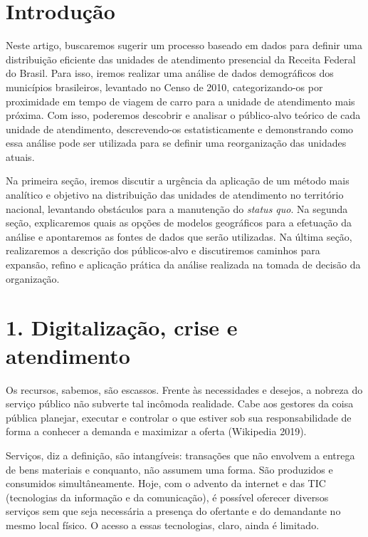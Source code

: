 \documentclass[]{article}
\begin{document}
\hypertarget{introducao}{%
\section{Introdução}\label{introducao}}

Neste artigo, buscaremos sugerir um processo baseado em dados para
definir uma distribuição eficiente das unidades de atendimento
presencial da Receita Federal do Brasil. Para isso, iremos realizar uma
análise de dados demográficos dos municípios brasileiros, levantado no
Censo de 2010, categorizando-os por proximidade em tempo de viagem de
carro para a unidade de atendimento mais próxima. Com isso, poderemos
descobrir e analisar o público-alvo teórico de cada unidade de
atendimento, descrevendo-os estatisticamente e demonstrando como essa
análise pode ser utilizada para se definir uma reorganização das
unidades atuais.

Na primeira seção, iremos discutir a urgência da aplicação de um método
mais analítico e objetivo na distribuição das unidades de atendimento no
território nacional, levantando obstáculos para a manutenção do
\emph{status quo}. Na segunda seção, explicaremos quais as opções de
modelos geográficos para a efetuação da análise e apontaremos as fontes
de dados que serão utilizadas. Na última seção, realizaremos a descrição
dos públicos-alvo e discutiremos caminhos para expansão, refino e
aplicação prática da análise realizada na tomada de decisão da
organização.

\hypertarget{digitalizacao-crise-e-atendimento}{%
\section{1. Digitalização, crise e
atendimento}\label{digitalizacao-crise-e-atendimento}}

Os recursos, sabemos, são escassos. Frente às necessidades e desejos, a
nobreza do serviço público não subverte tal incômoda realidade. Cabe aos
gestores da coisa pública planejar, executar e controlar o que estiver
sob sua responsabilidade de forma a conhecer a demanda e maximizar a
oferta (Wikipedia 2019).

Serviços, diz a definição, são intangíveis: transações que não envolvem
a entrega de bens materiais e conquanto, não assumem uma forma. São
produzidos e consumidos simultâneamente. Hoje, com o advento da internet
e das TIC (tecnologias da informação e da comunicação), é possível
oferecer diversos serviços sem que seja necessária a presença do
ofertante e do demandante no mesmo local físico. O acesso a essas
tecnologias, claro, ainda é limitado.
\end{document}
